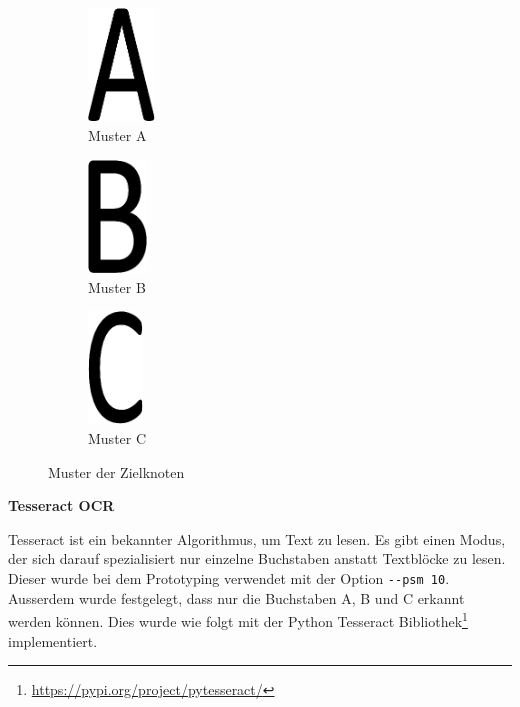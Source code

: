 \begin{figure}[H]
\begin{subfigure}{0.35\textwidth}
\centering
\includegraphics[height=30mm]{assets/informatik-prototyp/opencv/target_node_detection/a.png} 
\caption{Muster A}
\label{fig:image-a}
\end{subfigure}
\begin{subfigure}{0.2\textwidth}
\centering
\includegraphics[height=30mm]{assets/informatik-prototyp/opencv/target_node_detection/b.png} 
\caption{Muster B}
\label{fig:image-b}
\end{subfigure}
\begin{subfigure}{0.33\textwidth}
\centering
\includegraphics[height=30mm]{assets/informatik-prototyp/opencv/target_node_detection/c.png} 
\caption{Muster C}
\label{fig:image-c}
\end{subfigure}

\caption{Muster der Zielknoten}
\label{fig:muster-zielknoten}
\end{figure}


\textbf{Tesseract OCR}

Tesseract ist ein bekannter Algorithmus, um Text zu lesen. Es gibt einen Modus, der sich darauf spezialisiert nur einzelne Buchstaben anstatt Textblöcke zu lesen. Dieser wurde bei dem Prototyping verwendet mit der Option \verb|--psm 10|. Ausserdem wurde festgelegt, dass nur die Buchstaben A, B und C erkannt werden können. Dies wurde wie folgt mit der Python Tesseract Bibliothek\footnote{\url{https://pypi.org/project/pytesseract/}} implementiert. 


